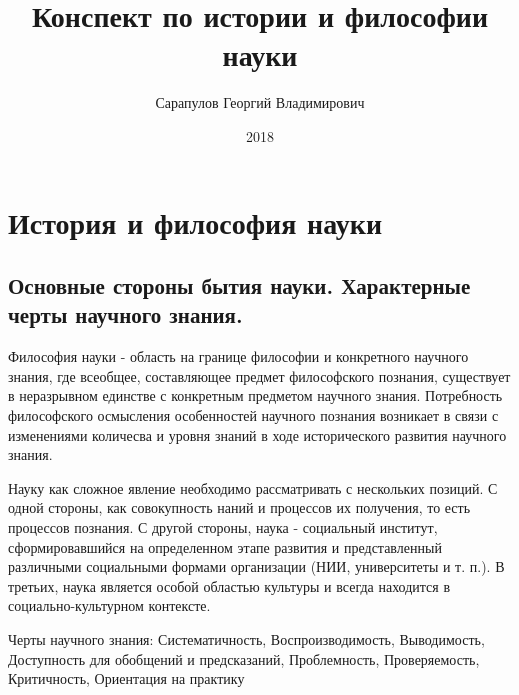 \documentclass[12pt, specialist, subf, substylefile = spbu.rtx]{disser}
\begin{document}

\title{Конспект по истории и философии науки}


\author{Сарапулов Георгий Владимирович}


\date{2018}

\maketitle


\tableofcontents


\chapter{История и философия науки}
\section{Основные стороны бытия науки. Характерные черты научного знания.}
Философия науки - область на границе философии и конкретного научного знания, где всеобщее, составляющее предмет философского познания, существует в неразрывном единстве с конкретным предметом научного знания. Потребность философского осмысления особенностей научного познания возникает в связи с изменениями количесва и уровня знаний в ходе исторического развития научного знания.

Науку как сложное явление необходимо рассматривать с нескольких позиций. С одной стороны, как совокупность наний и процессов их получения, то есть процессов познания. С другой стороны, наука - социальный институт, сформировавшийся на определенном этапе развития и представленный различными социальными формами организации (НИИ, университеты и т. п.). В третьих, наука является особой областью культуры и всегда находится в социально-культурном контексте.

Черты научного знания: Систематичность, Воспроизводимость, Выводимость, Доступность для обобщений и предсказаний, Проблемность, Проверяемость, Критичность, Ориентация на практику
\end{document}
